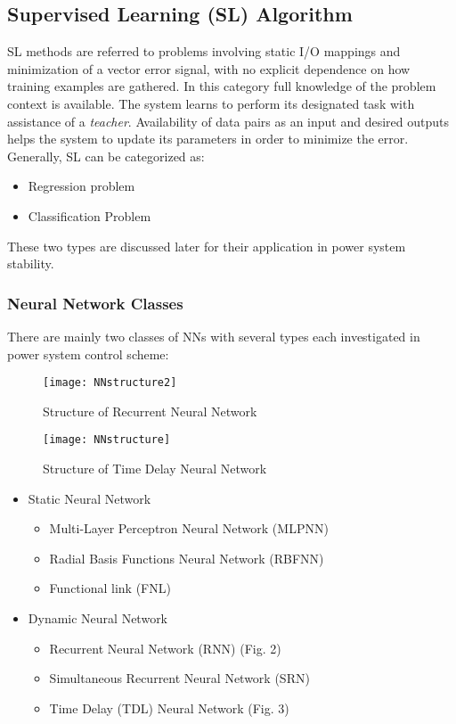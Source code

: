 \documentclass[journal]{IEEEtran}
\begin{document}
\vspace{-1mm}
\subsection{Supervised Learning (SL) Algorithm}
SL methods are referred to problems involving static I/O mappings and minimization of a vector error signal, with no explicit dependence on how training examples are gathered. In this category full knowledge of the problem context is available. The system learns to perform its designated task with assistance of a \textit{teacher}. Availability of data pairs as an input and desired outputs helps the system to update its parameters in order to minimize the error. Generally, SL can be categorized as: 
\begin{itemize}  
\item Regression problem
\item Classification Problem
\end{itemize}
These two types are discussed later for their application in power system stability.

\subsubsection{Neural Network Classes}
There are mainly two classes of NNs with several types each investigated in power system control scheme:  

\begin{figure}
\centering
\texttt{[image: NNstructure2]}
\caption{Structure of Recurrent Neural Network}
\label{fig:NNN}
\end{figure}
\begin{figure}
\centering
\texttt{[image: NNstructure]}
\caption{Structure of Time Delay Neural Network}
\label{fig:NNN}
\end{figure}

\begin{itemize}  
\item Static Neural Network
\begin{itemize} \setlength\itemsep{-0.2em}
\item Multi-Layer Perceptron Neural Network (MLPNN)
\item Radial Basis Functions Neural Network (RBFNN)
\item Functional link (FNL)
\end{itemize}
\item Dynamic Neural Network
\begin{itemize}
\item Recurrent Neural Network (RNN) (Fig. 2)
\item Simultaneous Recurrent Neural Network (SRN)
\item Time Delay (TDL) Neural Network (Fig. 3)
\end{itemize}
\end{itemize}
\end{document}
